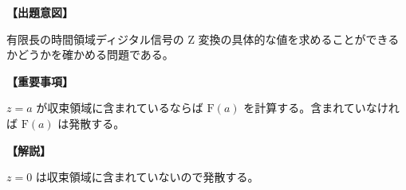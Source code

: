 \noindent \textbf{【出題意図】}

\bigskip
\noindent 有限長の時間領域ディジタル信号の Z 変換の具体的な値を求めることができるかどうかを確かめる問題である。

\vspace{1em}
\noindent \textbf{【重要事項】}

\medskip
$z = a$ が収束領域に含まれているならば $\textrm{F}(a)$ を計算する。含まれていなければ $\textrm{F}(a)$ は発散する。

\bigskip

\vspace{1em}
\noindent \textbf{【解説】}

\bigskip
\noindent $z = 0$ は収束領域に含まれていないので発散する。
